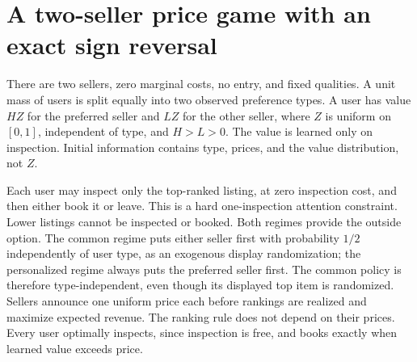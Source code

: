 \documentclass[11pt]{article}
\theoremstyle{remark}
\begin{document}
\section{A two-seller price game with an exact sign reversal}
There are two sellers, zero marginal costs, no entry, and fixed qualities. A unit mass of users is split equally into two observed preference types. A user has value $HZ$ for the preferred seller and $LZ$ for the other seller, where $Z$ is uniform on $[0,1]$, independent of type, and $H>L>0$. The value is learned only on inspection. Initial information contains type, prices, and the value distribution, not $Z$.

Each user may inspect only the top-ranked listing, at zero inspection cost, and then either book it or leave. This is a hard one-inspection attention constraint. Lower listings cannot be inspected or booked. Both regimes provide the outside option. The common regime puts either seller first with probability $1/2$ independently of user type, as an exogenous display randomization; the personalized regime always puts the preferred seller first. The common policy is therefore type-independent, even though its displayed top item is randomized. Sellers announce one uniform price each before rankings are realized and maximize expected revenue. The ranking rule does not depend on their prices. Every user optimally inspects, since inspection is free, and books exactly when learned value exceeds price.
\end{document}
